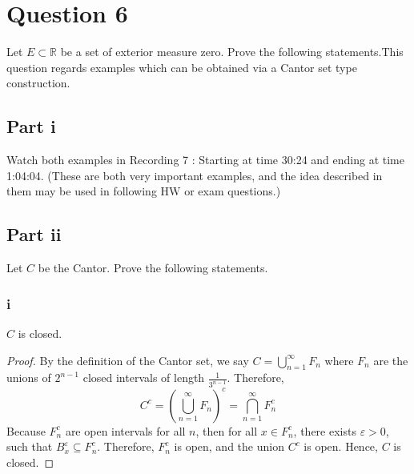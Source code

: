 \section{Question 6}

\begin{question}
    Let $E \subset \mathbb{R}$ be a set of exterior measure zero. Prove the following statements.This question regards examples which can be obtained via a Cantor set type construction.
\end{question}

\subsection{Part i}

\begin{question}
    Watch both examples in Recording 7 : Starting at time 30:24 and ending at time 1:04:04. (These are both very important examples, and the idea described in them may be used in following $\mathrm{HW}$ or exam questions.)
\end{question}

\subsection{Part ii}

\begin{question}
    Let $C$ be the Cantor. Prove the following statements.
\end{question}

\subsubsection{i}

\begin{question}
   $C$ is closed.
\end{question}

\begin{answer}
    \begin{proof}
        By the definition of the Cantor set, we say $C = \bigcup_{n = 1}^{\infty}F_n$ where $F_n$ are the unions of $2^{n-1}$ closed intervals of length $\tfrac{1}{3^{n-1}}$. Therefore,
        $$
            C^c = (\bigcup_{n = 1}^{\infty}F_n)^c = \bigcap_{n=1}^{\infty}F_n^c
        $$
        Because $F_n^{c}$ are open intervals for all $n$, then for all $x \in F_n^c$, there exists $\varepsilon > 0$, such that $B_x^{\varepsilon} \subseteq F_n^c$. Therefore, $F_n^c$ is open, and the union $C^c$ is open. Hence, $C$ is closed.
    \end{proof}
\end{answer}

